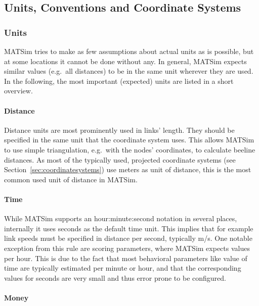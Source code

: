 \subsection{Units, Conventions and Coordinate Systems}
\label{sec:unitsconventions}
\subsubsection{Units}
MATSim tries to make as few assumptions about actual units as is possible, but at some locations it cannot be done without any. In general, MATSim expects similar values (e.g.\ all distances) to be in the same unit wherever they are used. In the following, the most important (expected) units are listed in a short overview. 

\paragraph{Distance}

Distance units are most prominently used in links' length. They should be specified in the same unit that the coordinate system uses. This allows MATSim to use simple triangulation, e.g.\ with the nodes' coordinates, to calculate beeline distances. As most of the typically used, projected coordinate systems (see Section~\ref{sec:coordinatesystems}) use meters as unit of distance, this is the most common used unit of distance in MATSim. 

\paragraph{Time}

While MATSim supports an hour:minute:second notation in several places, internally it uses seconds as the default time unit. This implies that for example link speeds must be specified in distance per second, typically m/s. One notable exception from this rule are scoring parameters, where MATSim expects values per hour. This is due to the fact that most behavioral parameters like value of time are typically estimated per minute or hour, and that the corresponding values for seconds are very small and thus error prone to be configured. 

\paragraph{Money}


